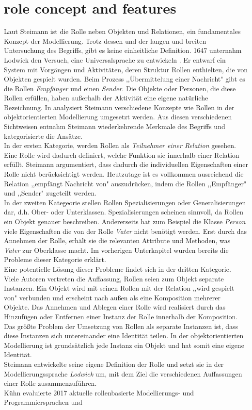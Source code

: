 \documentclass[conference]{IEEEtran}
\begin{document}
\section{role concept and features}Laut Steimann ist die Rolle neben Objekten und Relationen, ein fundamentales Konzept der Modellierung. Trotz dessen und der langen und breiten Untersuchung des Begriffs, gibt es keine einheitliche Definition. 1647 unternahm Lodwick den Versuch, eine Universalsprache zu entwickeln \cite{hunter2012lodwick}. Er entwarf ein System mit Vorgängen und Aktivitäten, deren Struktur Rollen enthielten, die von Objekten gespielt wurden. Beim Prozess ,,Übermittelung einer Nachricht" gibt es die Rollen \textit{Empfänger} und einen \textit{Sender}. Die Objekte oder Personen, die diese Rollen erfüllen, haben außerhalb der Aktivität eine eigene natürliche Bezeichnung. In \cite{steimann2000representation} analysiert Steimann verschiedene Konzepte wie Rollen in der objektorientierten Modellierung umgesetzt werden. Aus diesen verschiedenen Sichtweisen entnahm Steimann wiederkehrende Merkmale des Begriffs und kategorisierte die Ansätze. \\ In der ersten Kategorie, werden Rollen als \textit{Teilnehmer einer Relation} gesehen. Eine Rolle wird dadurch definiert, welche Funktion sie innerhalb einer Relation erfüllt. Steimann argumentiert, dass dadurch die individuellen Eigenschaften einer Rolle nicht berücksichtigt werden.  Heutzutage ist es vollkommen ausreichend die Relation ,,empfängt Nachricht von" auszudrücken, indem die Rollen ,,Empfänger" und ,,Sender" zugeteilt werden. \\ In der zweiten Kategeorie stellen Rollen Spezialisierungen oder Generalisierungen dar, d.h. Ober- oder Unterklassen. Spezialisierungen scheinen sinnvoll, da Rollen ein Objekt genauer beschreiben. Andererseits hat zum Beispiel die Klasse \textit{Person} viele Eigenschaften die von der Rolle \textit{Vater} nicht benötigt werden. Erst durch das Annehmen der Rolle, erhält sie die relevanten Attribute und Methoden, was \textit{Vater} zur Oberklasse macht. Im vorherigen Unterkapitel wurden bereits die Probleme dieser Kategorie erklärt.\\ Eine potentielle Lösung dieser Probleme findet sich in der dritten Kategorie. Viele Autoren vertreten die Auffassung, Rollen seien  zum Objekt separate Instanzen. Ein Objekt wird mit seinen Rollen mit der Relation ,,wird gespielt von" verbunden und erscheint nach außen als eine Komposition mehrerer Objekte. Das Annehmen und Ablegen einer Rolle wird realisiert durch das Hinzufügen oder Entfernen einer Instanz der Rolle innerhalb der Komposition. Das größte Problem der Umsetzung von Rollen als separate Instanzen ist, dass diese Instanzen sich untereinander eine Identität teilen. In der objektorientierten Modellierung ist grundsätzlich jede Instanz ein Objekt und hat somit eine eigene Identität. \\ Steimann entwickelte seine eigene Definition der Rolle und setzt sie in der Modellierungssprache \textit{Lodwick} um, mit dem Ziel die verschiedenen Auffassungen einer Rolle zusammenzuführen. \\Kühn evaluierte 2017 aktuelle rollenbasierte Modellierungs- und Programmiersprachen und 
\end{document}
